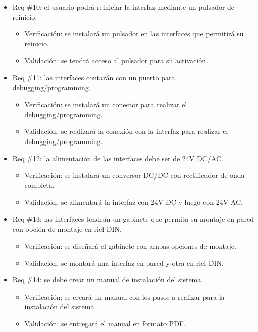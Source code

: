 \documentclass[
11pt%
]{charter}
\begin{document}
\begin{itemize}
\item Req \#10: el usuario podrá reiniciar la interfaz mediante un pulsador de reinicio.

\begin{itemize}
	\item Verificación: se instalará un pulsador en las interfaces que permitirá su reinicio. 
	\item Validación: se tendrá acceso al pulsador para su activación.
\end{itemize}

\item Req \#11: las interfaces contarán con un puerto para debugging/programming.

\begin{itemize}
	\item Verificación: se instalará un conector para realizar el debugging/programming. 
	\item Validación: se realizará la conexión con la interfaz para realizar el debugging/programming.
\end{itemize}

\item Req \#12: la alimentación de las interfaces debe ser de 24V DC/AC.

\begin{itemize}
	\item Verificación: se instalará un conversor DC/DC con rectificador de onda completa. 
	\item Validación: se alimentará la interfaz con 24V DC y luego con 24V AC.
\end{itemize}

\item Req \#13: las interfaces tendrán un gabinete que permita su montaje en pared con opción de montaje en riel DIN.

\begin{itemize}
	\item Verificación: se diseñará el gabinete con ambas opciones de montaje.
	\item Validación: se montará una interfaz en pared y otra en riel DIN.
\end{itemize}

\item Req \#14: se debe crear un manual de instalación del sistema.

\begin{itemize}
	\item Verificación: se creará un manual con los pasos a realizar para la instalación del sistema.
	\item Validación: se entregará el manual en formato PDF.
\end{itemize}


\end{itemize}
\end{document}

